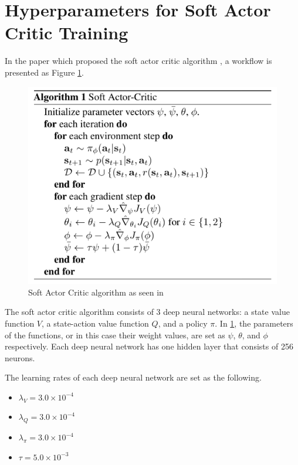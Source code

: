 \section{Hyperparameters for Soft Actor Critic Training} \label{append:2}

In the paper which proposed the soft actor critic algorithm \cite{haarnoja2018soft}, a workflow is presented as Figure \ref{fig:sac_algorithm}.

  \begin{figure}[H]
      \centering
      \includegraphics[width=1\textwidth]{figures/external/sac_algorithm.png}
      \caption{Soft Actor Critic algorithm as seen in \cite{haarnoja2018soft}}
      \label{fig:sac_algorithm}
  \end{figure}

The soft actor critic algorithm consists of 3 deep neural networks: a state value function $V$, a state-action value function $Q$, and a policy $\pi$. In \ref{fig:sac_algorithm}, the parameters of the functions, or in this case their weight values, are set as $\psi$, $\theta$, and $\phi$ respectively. Each deep neural network has one hidden layer that consists of 256 neurons.

The learning rates of each deep neural network are set as the following.
  \begin{itemize}
    \item $\lambda_V = 3.0 \times 10^{-4}$
    \item $\lambda_Q = 3.0 \times 10^{-4}$
    \item $\lambda_\pi = 3.0 \times 10^{-4}$
    \item $\tau = 5.0 \times 10^{-3}$
  \end{itemize}


